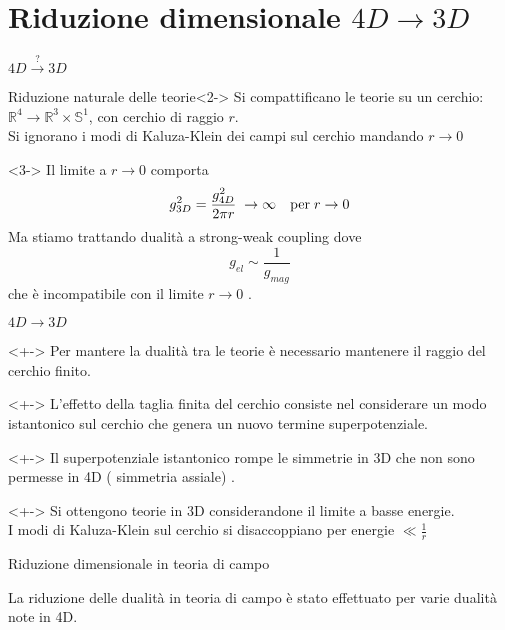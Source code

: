 \documentclass[9pt,compress]{beamer}
\begin{document}
\section{Riduzione dimensionale $4D \rightarrow 3D$}
\begin{frame}{$4D\overset{?}{ \longrightarrow} 3D $}

\begin{block}{Riduzione naturale delle teorie}<2->
Si compattificano le teorie su un cerchio: $\mathbb{R}^4 \longrightarrow \mathbb{R}^3 \times \mathbb{S}^1$, con  cerchio di raggio $r$.\\
Si ignorano i modi di Kaluza-Klein dei campi sul cerchio mandando $r \rightarrow 0 $
\end{block}








\begin{block}{}<3->
Il limite a $r \rightarrow 0$ comporta
$$
 g^2_{3D} = \frac{g^2_{4D}}{2 \pi r} \; \rightarrow \infty \quad \hbox{per} \; r\rightarrow 0
$$
Ma stiamo trattando dualità a strong-weak coupling dove
$$
g_{el} \sim \frac{1}{g_{mag}}
$$ 
che è incompatibile con il limite $r \rightarrow 0 $ .
\end{block}

\end{frame}

\begin{frame}{$4D \rightarrow 3D$ }
\begin{block}{}<+->
Per mantere la dualità tra le teorie è necessario mantenere il raggio del cerchio finito.\\
\end{block}
\begin{block}{}<+->
L'effetto della taglia finita del cerchio consiste nel considerare un modo istantonico sul cerchio che genera un nuovo termine superpotenziale.
\end{block}
\begin{block}{}<+->
Il superpotenziale istantonico rompe le simmetrie in 3D che non sono permesse in 4D ( simmetria assiale) . 
\end{block}

\begin{block}{}<+->
Si ottengono teorie in 3D considerandone il limite a basse energie.\\
I modi di Kaluza-Klein sul cerchio si disaccoppiano per energie $\ll \frac{1}{r}$
\end{block}

\end{frame}

\begin{frame}{Riduzione dimensionale in teoria di campo}
\begin{block}{}
La riduzione delle dualità in teoria di campo è stato effettuato per varie dualità note in 4D.\\

\end{block}

\end{frame}







\nocite{*}
%

\end{document}
